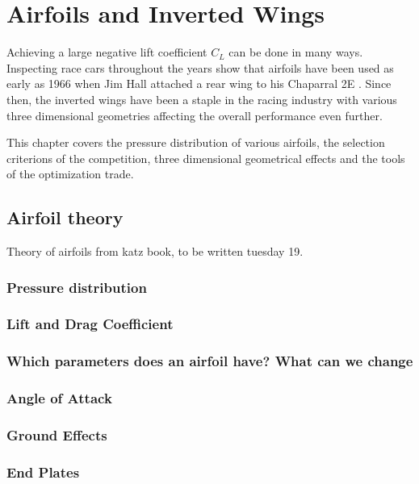 \chapter{Airfoils and Inverted Wings}

Achieving a large negative lift coefficient $C_L$ can be done in many ways. Inspecting race cars throughout the years show that airfoils have been used as early as 1966 when Jim Hall attached a rear wing to his Chaparral 2E \cite{hucho}. Since then, the inverted wings have been a staple in the racing industry with various three dimensional geometries affecting the overall performance even further.

This chapter covers the pressure distribution of various airfoils, the selection criterions of the competition, three dimensional geometrical effects and the tools of the optimization trade.

\section{Airfoil theory}
Theory of airfoils from katz book, to be written tuesday 19.
  \subsection{Pressure distribution}

  \subsection{Lift and Drag Coefficient}

  \subsection{Which parameters does an airfoil have? What can we change}

  \subsection{Angle of Attack}

  \subsection{Ground Effects}

  \subsection{End Plates}


